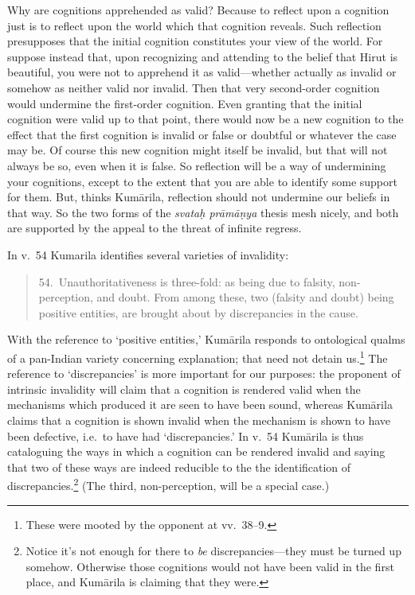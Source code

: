 \documentclass[11pt,letterpaper,oneside]{amsart}
\newenvironment{squote}{\begin{quote}\sf\small}{\rm\end{quote}} %
\newcommand{\kum}{Kum\={a}rila}
\begin{document}
Why are cognitions apprehended as valid? Because to reflect upon a cognition just is to reflect upon the world which that cognition reveals. Such reflection presupposes that the initial cognition constitutes your view of the world. For suppose instead that, upon recognizing and attending to the belief that Hirut is beautiful, you were not to apprehend it as valid---whether actually as invalid or somehow as neither valid nor invalid. Then that very second-order cognition would undermine the first-order cognition. Even granting that the initial cognition were valid up to that point, there would now be a new cognition to the effect that the first cognition is invalid or false or doubtful or whatever the case may be. Of course this new cognition might itself be invalid, but that will not always be so, even when it is false. So reflection will be a way of undermining your cognitions, except to the extent that you are able to identify some support for them. But, thinks \kum, reflection should not undermine our beliefs in that way. So the two forms of the \emph{svata\d h pr\=am\=a\d nya} thesis mesh nicely, and both are supported by the appeal to the threat of infinite regress.%


In v.\ 54 Kumarila identifies several varieties of invalidity:\begin{squote}54.\ Unauthoritativeness is three-fold: as being due to falsity, non-perception, and doubt. From among these, two (falsity and doubt) being positive entities, are brought about by discrepancies in the cause.\end{squote} With the reference to `positive entities,' Kum\=arila responds to ontological qualms of a pan-Indian variety concerning explanation; that need not detain us.\footnote{These were mooted by the opponent at vv.\ 38--9.} The reference to `discrepancies' is more important for our purposes: the proponent of intrinsic invalidity will claim that a cognition is rendered valid when the mechanisms which produced it are seen to have been sound, whereas Kum\=arila claims that a cognition is shown invalid when the mechanism is shown to have been defective, i.e.\ to have had `discrepancies.' In v.~54 Kum\=arila is thus cataloguing the ways in which a cognition can be rendered invalid and saying that two of these ways are indeed reducible to the the identification of discrepancies.\footnote{Notice it's not enough for there to \emph{be} discrepancies---they must be turned up somehow. Otherwise those cognitions would not have been valid in the first place, and Kum\=arila is claiming that they were.} (The third, non-perception, will be a special case.)
\end{document}
